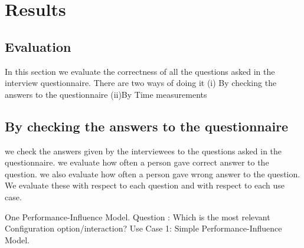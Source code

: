 \chapter{Results}




\section{Evaluation}
In this section we evaluate the correctness of all the questions asked in the interview questionnaire.
There are two ways of doing it 
  (i) By checking the answers to the questionnaire
  (ii)By Time measurements
  
\section{By checking the answers to the questionnaire}
 we check the answers given by the interviewees to the questions asked in the questionnaire. we evaluate how often a person gave correct answer to the question. we also evaluate how often a person gave wrong answer to the question. We evaluate these with respect to each question and with respect to each use case.
 
One Performance-Influence Model.
\newline
Question : Which is the most relevant Configuration option/interaction?
\newline
\newline
Use Case 1: Simple Performance-Influence Model.


